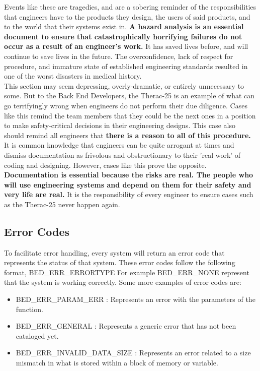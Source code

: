 \documentclass{article}
\begin{document}
Events like these are tragedies, and are a sobering reminder of the responsibilities that engineers have to the products they design, the users of said products, and to the world that their systems exist in. \textbf{A hazard analysis is an essential document to ensure that catastrophically horrifying failures do not occur as a result of an engineer's work.} It has saved lives before, and will continue to save lives in the future. The overconfidence, lack of respect for procedure, and immature state of established engineering standards resulted in one of the worst disasters in medical history.\\

This section may seem depressing, overly-dramatic, or entirely unnecessary to some. But to the Back End Developers, the Therac-25 is an example of what can go terrifyingly wrong when engineers do not perform their due diligence. Cases like this remind the team members that they could be the next ones in a position to make safety-critical decisions in their engineering designs. This case also should remind all engineers that \textbf{there is a reason to all of this procedure.} It is common knowledge that engineers can be quite arrogant at times and dismiss documentation as frivolous and obstructionary to their 'real work' of coding and designing. However, cases like this prove the opposite. \textbf{Documentation is essential because the risks are real. The people who will use engineering systems and depend on them for their safety and very life are real.} It is the responsibility of every engineer to ensure cases such as the Therac-25 never happen again.\\

\subsection*{Error Codes}
To facilitate error handling, every system will return an error code that represents the status of that system. These error codes follow the following format, BED\_ERR\_ERRORTYPE
For example BED\_ERR\_NONE represent that the system is working correctly. Some more examples of error codes are:
\begin{itemize}
	\item BED\_ERR\_PARAM\_ERR		 	: Represents an error with the parameters of the function.
	\item BED\_ERR\_GENERAL			 	: Represents a generic error that has not been cataloged yet.
	\item BED\_ERR\_INVALID\_DATA\_SIZE	: Represents an error related to a size mismatch in what is stored within a block of memory or variable.
\end{itemize}
\end{document}
